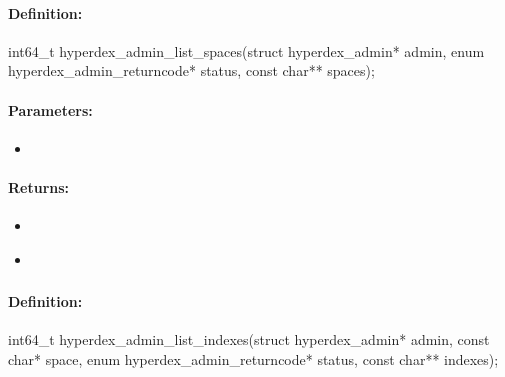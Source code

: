 \paragraph{Definition:}
\begin{ccode}
int64_t hyperdex_admin_list_spaces(struct hyperdex_admin* admin,
        enum hyperdex_admin_returncode* status,
        const char** spaces);
\end{ccode}

\paragraph{Parameters:}
\begin{itemize}[noitemsep]
\item {}\\

\end{itemize}

\paragraph{Returns:}
\begin{itemize}[noitemsep]
\item {}\\

\item {}\\

\end{itemize}

\pagebreak
\subsubsection{}
\label{api:c:list_indexes}


\paragraph{Definition:}
\begin{ccode}
int64_t hyperdex_admin_list_indexes(struct hyperdex_admin* admin,
        const char* space,
        enum hyperdex_admin_returncode* status,
        const char** indexes);
\end{ccode}

